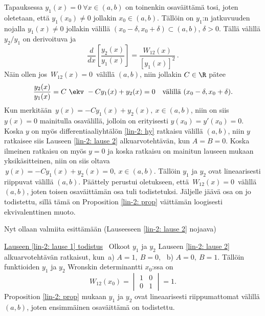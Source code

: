 Tapauksessa $y_1(x)=0\ \forall x\in(a,b)$ on toinenkin osaväittämä tosi, joten oletetaan, että
$y_1(x_0) \neq 0$ jollakin $x_0\in(a,b)$. Tällöin on $y_1$:n jatkuvuuden nojalla 
$y_1(x) \neq 0$ jollakin välillä $(x_0-\delta,x_0+\delta)\subset(a,b)$, $\delta>0$. Tällä 
välillä $y_2/y_1$ on derivoituva ja
\[
\frac{d}{dx}\left[\frac{y_2(x)}{y_1(x)}\right]=\frac{W_{12}(x)}{[y_1(x)]^2}\,.
\]
Näin ollen jos $\,W_{12}(x)=0\,$ välillä $(a,b)$, niin jollakin $C\in\R$ pätee
\[
\frac{y_2(x)}{y_1(x)}=C\ \ekv\ -Cy_1(x)+y_2(x)= 0 \quad \text{välillä}\ (x_0-\delta,x_0+\delta).
\]
Kun merkitään $\,y(x)=-Cy_1(x)+y_2(x),\ x\in(a,b)$, niin on siis $y(x)=0$ mainitulla osavälillä,
jolloin on erityisesti $y(x_0)=y'(x_0)=0$. Koska $y$ on myös differentiaaliyhtälön 
\eqref{lin-2: hy} ratkaisu välillä $(a,b)$, niin $y$ ratkaisee siis Lauseen \ref{lin-2: lause 2}
alkuarvotehtävän, kun $A=B=0$. Koska ilmeinen ratkaisu on myös $y=0$ ja koska ratkaisu on 
mainitun lauseen mukaan yksikäsitteinen, niin on siis oltava 
$\,y(x)=-Cy_1(x)+y_2(x)=0,\ x\in(a,b)$. Tällöin $y_1$ ja $y_2$ ovat lineaarisesti riippuvat
välillä $(a,b)$. Päättely perustui oletukseen, että $\,W_{12}(x)=0\,$ välillä $(a,b)$, joten
toisen osaväittämän osa \fbox{$\impl$} tuli todistetuksi. Jäljelle jäävä osa \fbox{$\Leftarrow$}
on jo todistettu, sillä tämä on Proposition \ref{lin-2: prop} väittämän loogisesti
ekvivalenttinen muoto. \loppu

Nyt ollaan valmiita esittämään (Lauseeseen \ref{lin-2: lause 2} nojaava)
 
\underline{Lauseen \ref{lin-2: lause 1} todistus} \ Olkoot $y_1$ ja $y_2$ Lauseen 
\ref{lin-2: lause 2} alkuarvotehtävän ratkaisut, kun\, a) $A=1,\ B=0$, \ b) $A=0,\ B=1$.
Tällöin funktioiden $y_1$ ja $y_2$ Wronskin determinantti $x_0$:ssa on
\[
W_{12}(x_0)=\begin{vmatrix}
1 & 0 \\
0 & 1
\end{vmatrix}=1.
\]
Proposition \ref{lin-2: prop} mukaan $y_1$ ja $y_2$ ovat lineaarisesti riippumattomat välillä
$(a,b)$, joten ensimmäinen osaväittämä on todistettu.

